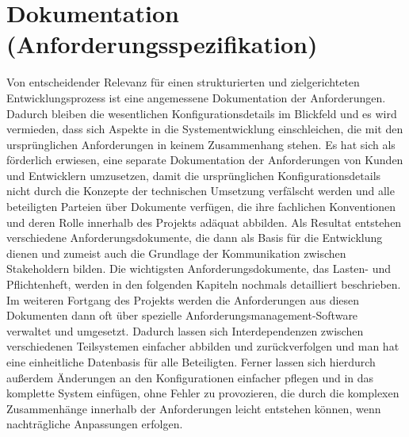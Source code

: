 \section{Dokumentation (Anforderungsspezifikation)}
Von entscheidender Relevanz für einen strukturierten und zielgerichteten Entwicklungsprozess ist eine angemessene Dokumentation der Anforderungen. Dadurch bleiben die wesentlichen Konfigurationsdetails im Blickfeld und es wird vermieden, dass sich Aspekte in die Systementwicklung einschleichen, die mit den ursprünglichen Anforderungen in keinem Zusammenhang stehen. 
Es hat sich als förderlich erwiesen, eine separate Dokumentation der Anforderungen von Kunden und Entwicklern umzusetzen, damit die ursprünglichen Konfigurationsdetails nicht durch die Konzepte der technischen Umsetzung verfälscht werden und alle beteiligten Parteien über Dokumente verfügen, 
die ihre fachlichen Konventionen und deren Rolle innerhalb des Projekts adäquat abbilden. Als Resultat entstehen 
verschiedene Anforderungsdokumente, die dann als Basis für die Entwicklung dienen und zumeist auch die Grundlage der Kommunikation zwischen Stakeholdern bilden. Die wichtigsten Anforderungsdokumente, das Lasten- und 
Pflichtenheft, werden in den folgenden Kapiteln nochmals detailliert beschrieben. 
Im weiteren Fortgang des Projekts werden die Anforderungen aus diesen Dokumenten dann oft über spezielle Anforderungsmanagement-Software verwaltet und umgesetzt. Dadurch lassen sich Interdependenzen zwischen verschiedenen Teilsystemen einfacher abbilden und zurückverfolgen und man hat eine einheitliche Datenbasis für alle Beteiligten. Ferner lassen sich hierdurch außerdem Änderungen an den Konfigurationen einfacher pflegen und in das komplette System einfügen, ohne Fehler zu provozieren, die durch die komplexen Zusammenhänge innerhalb der Anforderungen leicht entstehen können, wenn nachträgliche Anpassungen erfolgen.
\cite{fraunhofer-anforderung}

